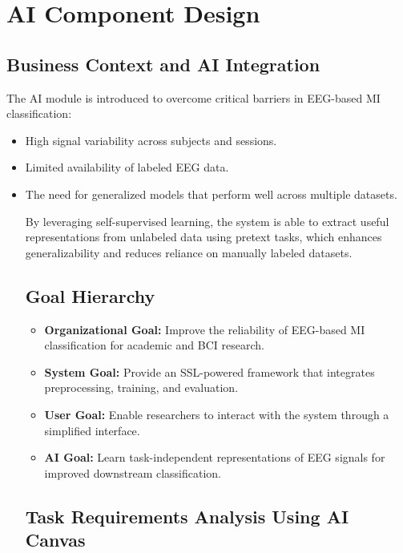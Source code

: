 \chapter{AI Component Design}
\label{ch:ai-component-design}

\section{Business Context and AI Integration}
\label{sec:business-context}

The AI module is introduced to overcome critical barriers in EEG-based MI classification:
\begin{itemize}
    \item High signal variability across subjects and sessions.
    \item Limited availability of labeled EEG data.
    \item The need for generalized models that perform well across multiple datasets.

    By leveraging self-supervised learning, the system is able to extract useful representations from unlabeled data using pretext tasks, which enhances generalizability and reduces reliance on manually labeled datasets.

    \section{Goal Hierarchy}
    \label{sec:goal-hierarchy}

    \begin{itemize}
        \item \textbf{Organizational Goal:} Improve the reliability of EEG-based MI classification for academic and BCI research.
        \item \textbf{System Goal:} Provide an SSL-powered framework that integrates preprocessing, training, and evaluation.
        \item \textbf{User Goal:} Enable researchers to interact with the system through a simplified interface.
        \item \textbf{AI Goal:} Learn task-independent representations of EEG signals for improved downstream classification.
    \end{itemize}

    \section{Task Requirements Analysis Using AI Canvas}
    \label{sec:task-requirements}


\end{itemize}
